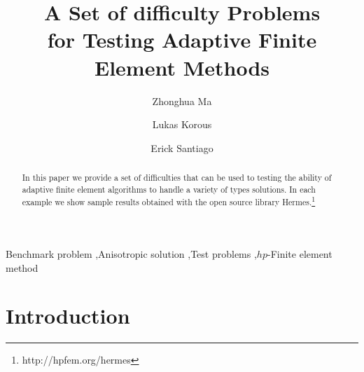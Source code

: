 \documentclass[12pt]{elsarticle}
\begin{document}
\begin{frontmatter}



\title{A Set of difficulty Problems\\ for Testing Adaptive Finite Element Methods}

\author[label1]{Zhonghua Ma}
\author[label2]{Lukas Korous}
\author[label3]{Erick Santiago}
\address[label1]{China University of Petroleum, Beijing, China}
\address[label2]{Charles University, Prague, Czech Republic}
\address[label3]{University of Nevada, Reno, USA}

\begin{abstract}
In this paper we provide a set of difficulties that can be used to
testing the ability of adaptive finite element algorithms to handle
a variety of types solutions.
In each example we show sample results obtained with the
open source library {\sc Hermes}.\footnote{http://hpfem.org/hermes}
\end{abstract}

\begin{keyword}
Benchmark problem \sep Anisotropic solution \sep Test problems \sep $hp$-Finite element method
\end{keyword}

\end{frontmatter}


\section{Introduction}
\label{sec:intro}
\end{document}
